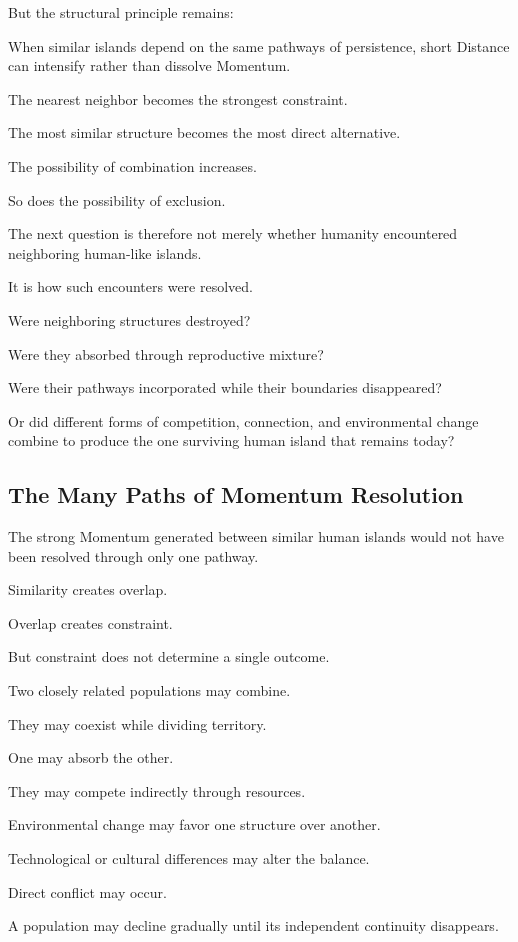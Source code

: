 But the structural principle remains:

When similar islands depend on the same pathways of persistence, short Distance can intensify rather than dissolve Momentum.

The nearest neighbor becomes the strongest constraint.

The most similar structure becomes the most direct alternative.

The possibility of combination increases.

So does the possibility of exclusion.

The next question is therefore not merely whether humanity encountered neighboring human-like islands.

It is how such encounters were resolved.

Were neighboring structures destroyed?

Were they absorbed through reproductive mixture?

Were their pathways incorporated while their boundaries disappeared?

Or did different forms of competition, connection, and environmental change combine to produce the one surviving human island that remains today?

\subsection*{\textbf{The Many Paths of Momentum Resolution}}


The strong Momentum generated between similar human islands would not have been resolved through only one pathway.

Similarity creates overlap.

Overlap creates constraint.

But constraint does not determine a single outcome.

Two closely related populations may combine.

They may coexist while dividing territory.

One may absorb the other.

They may compete indirectly through resources.

Environmental change may favor one structure over another.

Technological or cultural differences may alter the balance.

Direct conflict may occur.

A population may decline gradually until its independent continuity disappears.

